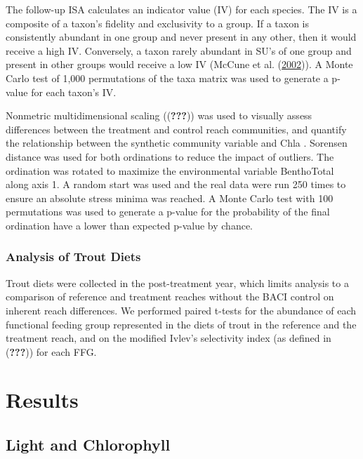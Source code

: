 \documentclass[double,12pt]{beavtex}
\begin{document}
  The follow-up ISA calculates an indicator value (IV) for each species.
  The IV is a composite of a taxon's fidelity and exclusivity to a group.
  If a taxon is consistently abundant in one group and never present in
  any other, then it would receive a high IV. Conversely, a taxon rarely
  abundant in SU's of one group and present in other groups would receive
  a low IV (McCune et al. (\protect\hyperlink{ref-McCune2002}{2002})). A
  Monte Carlo test of 1,000 permutations of the taxa matrix was used to
  generate a p-value for each taxon's IV.
  
  Nonmetric multidimensional scaling (({\textbf{???}})) was used to
  visually assess differences between the treatment and control reach
  communities, and quantify the relationship between the synthetic
  community variable and Chla . Sorensen distance was used for both
  ordinations to reduce the impact of outliers. The ordination was rotated
  to maximize the environmental variable BenthoTotal along axis 1. A
  random start was used and the real data were run 250 times to ensure an
  absolute stress minima was reached. A Monte Carlo test with 100
  permutations was used to generate a p-value for the probability of the
  final ordination have a lower than expected p-value by chance.
  
  \subsection*{Analysis of Trout Diets}\label{analysis-of-trout-diets}
  
  Trout diets were collected in the post-treatment year, which limits
  analysis to a comparison of reference and treatment reaches without the
  BACI control on inherent reach differences. We performed paired t-tests
  for the abundance of each functional feeding group represented in the
  diets of trout in the reference and the treatment reach, and on the
  modified Ivlev's selectivity index (as defined in ({\textbf{???}})) for
  each FFG.
  
  \chapter*{Results}\label{results}
  
  \section*{Light and Chlorophyll}\label{light-and-chlorophyll}
  
\end{document}
